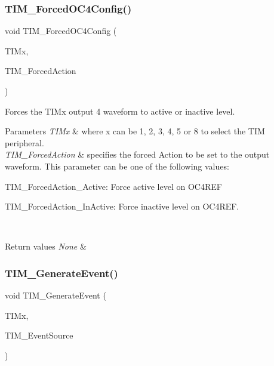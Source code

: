 \subsubsection{\texorpdfstring{TIM\_ForcedOC4Config()}{TIM\_ForcedOC4Config()}}
{\footnotesize\ttfamily void T\+I\+M\+\_\+\+Forced\+O\+C4\+Config (\begin{DoxyParamCaption}\item[{\mbox{\hyperlink{struct_t_i_m___type_def}{T\+I\+M\+\_\+\+Type\+Def}} $\ast$}]{T\+I\+Mx,  }\item[{uint16\+\_\+t}]{T\+I\+M\+\_\+\+Forced\+Action }\end{DoxyParamCaption})}



Forces the T\+I\+Mx output 4 waveform to active or inactive level. 


\begin{DoxyParams}{Parameters}
{\em T\+I\+Mx} & where x can be 1, 2, 3, 4, 5 or 8 to select the T\+IM peripheral. \\
\hline
{\em T\+I\+M\+\_\+\+Forced\+Action} & specifies the forced Action to be set to the output waveform. This parameter can be one of the following values\+: \begin{DoxyItemize}
\item T\+I\+M\+\_\+\+Forced\+Action\+\_\+\+Active\+: Force active level on O\+C4\+R\+EF \item T\+I\+M\+\_\+\+Forced\+Action\+\_\+\+In\+Active\+: Force inactive level on O\+C4\+R\+EF. \end{DoxyItemize}
\\
\hline
\end{DoxyParams}

\begin{DoxyRetVals}{Return values}
{\em None} & \\
\hline
\end{DoxyRetVals}
\mbox{\label{group___t_i_m___exported___functions_ga38bd4ffda920dd4f7655a0a2c6100a6e}} 
\subsubsection{\texorpdfstring{TIM\_GenerateEvent()}{TIM\_GenerateEvent()}}
{\footnotesize\ttfamily void T\+I\+M\+\_\+\+Generate\+Event (\begin{DoxyParamCaption}\item[{\mbox{\hyperlink{struct_t_i_m___type_def}{T\+I\+M\+\_\+\+Type\+Def}} $\ast$}]{T\+I\+Mx,  }\item[{uint16\+\_\+t}]{T\+I\+M\+\_\+\+Event\+Source }\end{DoxyParamCaption})}



